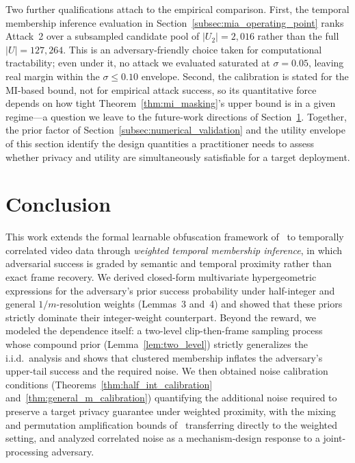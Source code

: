 \documentclass[sigconf,anonymous, review]{acmart}
\begin{document}
Two further qualifications attach to the empirical comparison. First, the temporal membership inference evaluation in Section~\ref{subsec:mia_operating_point} ranks Attack~2 over a subsampled candidate pool of $|U_2| = 2{,}016$ rather than the full $|U| = 127{,}264$. This is an adversary-friendly choice taken for computational tractability; even under it, no attack we evaluated saturated at $\sigma = 0.05$, leaving real margin within the $\sigma \le 0.10$ envelope. Second, the calibration is stated for the MI-based bound, not for empirical attack success, so its quantitative force depends on how tight Theorem~\ref{thm:mi_masking}'s upper bound is in a given regime---a question we leave to the future-work directions of Section~\ref{sec:conclusion}. Together, the prior factor of Section~\ref{subsec:numerical_validation} and the utility envelope of this section identify the design quantities a practitioner needs to assess whether privacy and utility are simultaneously satisfiable for a target deployment.


\section{Conclusion}
\label{sec:conclusion}

This work extends the formal learnable obfuscation framework of~\cite{xiao2024formal} to temporally correlated video data through \emph{weighted temporal membership inference}, in which adversarial success is graded by semantic and temporal proximity rather than exact frame recovery. We derived closed-form multivariate hypergeometric expressions for the adversary's prior success probability under half-integer and general $1/m$-resolution weights (Lemmas~3 and~4) and showed that these priors strictly dominate their integer-weight counterpart. Beyond the reward, we modeled the dependence itself: a two-level clip-then-frame sampling process whose compound prior (Lemma~\ref{lem:two_level}) strictly generalizes the i.i.d.\ analysis and shows that clustered membership inflates the adversary's upper-tail success and the required noise. We then obtained noise calibration conditions (Theorems~\ref{thm:half_int_calibration} and~\ref{thm:general_m_calibration}) quantifying the additional noise required to preserve a target privacy guarantee under weighted proximity, with the mixing and permutation amplification bounds of~\cite{xiao2024formal} transferring directly to the weighted setting, and analyzed correlated noise as a mechanism-design response to a joint-processing adversary.
\end{document}
